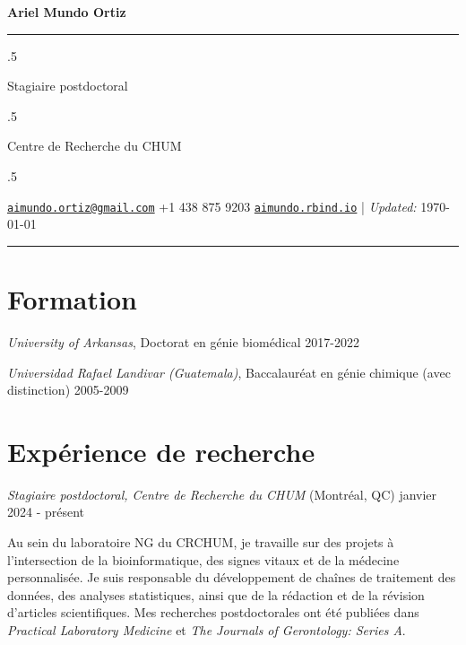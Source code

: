 \documentclass[10pt,]{article}
\begin{document}
\centerline{\huge \bf Ariel Mundo Ortiz}

\vspace{2 mm}

\hrule

\vspace{2 mm}

\moveleft.5\hoffset\centerline{Stagiaire postdoctoral}
\moveleft.5\hoffset\centerline{Centre de Recherche du CHUM}
\moveleft.5\hoffset\centerline{ \faEnvelopeO \hspace{1 mm} \href{mailto:}{\tt \href{mailto:aimundo.ortiz@gmail.com}{\nolinkurl{aimundo.ortiz@gmail.com}}} \hspace{1 mm}  \faPhone \hspace{1 mm}  +1
438 875
9203  \hspace{1 mm}       \faGlobe \hspace{1 mm} \href{http://aimundo.rbind.io}{\tt aimundo.rbind.io}    | \emph{Updated:} \apstylekinda\today}



\vspace{2 mm}

\hrule



\section{Formation}\label{formation}

\emph{University of Arkansas}, Doctorat en génie biomédical
\hfill 2017-2022

\emph{Universidad Rafael Landivar (Guatemala)}, Baccalauréat en génie
chimique (avec distinction) \hfill 2005-2009

\section{Expérience de recherche}\label{expuxe9rience-de-recherche}

\emph{Stagiaire postdoctoral, Centre de Recherche du CHUM} (Montréal,
QC) \hfill janvier 2024 - présent

Au sein du laboratoire NG du CRCHUM, je travaille sur des projets à
l'intersection de la bioinformatique, des signes vitaux et de la
médecine personnalisée. Je suis responsable du développement de chaînes
de traitement des données, des analyses statistiques, ainsi que de la
rédaction et de la révision d'articles scientifiques. Mes recherches
postdoctorales ont été publiées dans \emph{Practical Laboratory
Medicine} et \emph{The Journals of Gerontology: Series A}.
\end{document}
